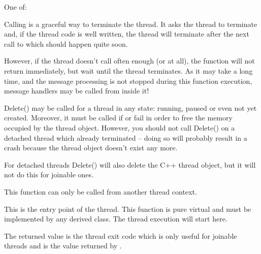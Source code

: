 
One of:

\twocolwidtha{7cm}
\begin{twocollist}\itemsep=0pt
\end{twocollist}


\label{wxthreaddelete}


Calling  is a graceful way to terminate the
thread. It asks the thread to terminate and, if the thread code is well
written, the thread will terminate after the next call to 
 which should happen quite soon.

However, if the thread doesn't call 
often enough (or at all), the function will not return immediately, but wait
until the thread terminates. As it may take a long time, and the message processing
is not stopped during this function execution, message handlers may be
called from inside it!

Delete() may be called for a thread in any state: running, paused or even not
yet created. Moreover, it must be called if  or
 fail in order to free the memory occupied by the
thread object. However, you should not call Delete() on a detached thread which
already terminated -- doing so will probably result in a crash because the
thread object doesn't exist any more.

For detached threads Delete() will also delete the C++ thread object, but it
will not do this for joinable ones.

This function can only be called from another thread context.


\label{wxthreadentry}


This is the entry point of the thread. This function is pure virtual and must
be implemented by any derived class. The thread execution will start here.

The returned value is the thread exit code which is only useful for
joinable threads and is the value returned by .

